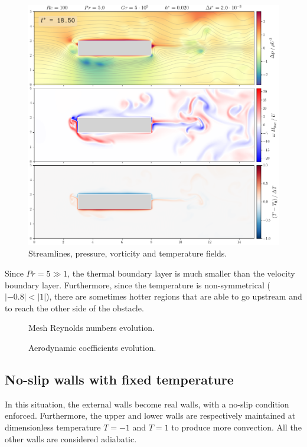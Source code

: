 \documentclass[11 pt]{article}
\begin{document}
\begin{figure}[H]
    \centering
    \includegraphics[width=\textwidth]{../figures/frame_00185_hot_cold.png}
    \caption{Streamlines, pressure, vorticity and temperature fields.}
    \label{fig:simu_hot_cold}
\end{figure}
Since $Pr=5 \gg 1$, the thermal boundary layer is much smaller than the velocity boundary layer. Furthermore, since the temperature is non-symmetrical ($|-0.8|<|1|$), there are sometimes hotter regions that are able to go upstream and to reach the other side of the obstacle.

\begin{figure}[H]
    \centering
    
    \caption{Mesh Reynolds numbers evolution.}
    \label{fig:mesh_re_hot_cold}
\end{figure}

\begin{figure}[H]
    \centering
    
    \caption{Aerodynamic coefficients evolution.}
    \label{fig:drag_hot_cold}
\end{figure}


\subsection{No-slip walls with fixed temperature}
In this situation, the external walls become real walls, with a no-slip condition enforced. Furthermore, the upper and lower walls are respectively maintained at dimensionless temperature $T=-1$ and $T=1$ to produce more convection. All the other walls are considered adiabatic.
\end{document}
